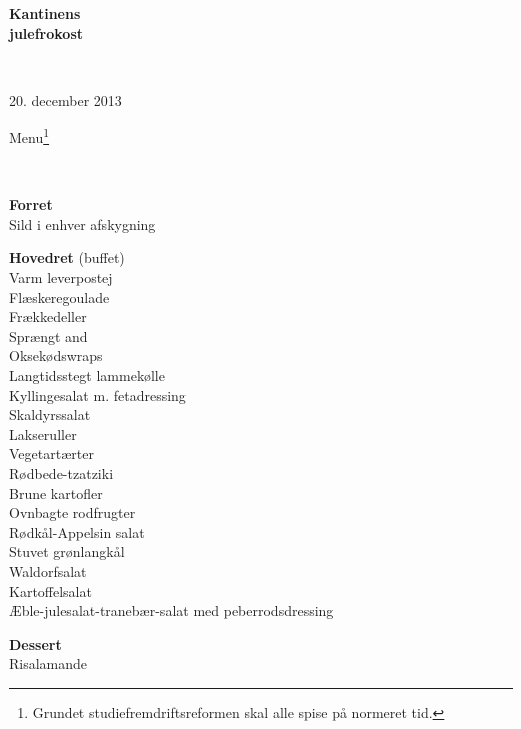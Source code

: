 \begin{center}
\begin{HUGE}
\textbf{Kantinens \\[3mm] julefrokost}
\end{HUGE}
\\[.6cm]
\begin{Large}
20. december 2013
\end{Large}
\end{center}
\vspace*{.01cm}
\begin{flushleft}
\begin{huge}
    Menu\footnote{Grundet studiefremdriftsreformen skal alle spise på normeret
    tid.}
\end{huge}
\\[.1cm]
\newcommand{\course}[1]{\vspace*{4mm} \textbf{#1} \vspace{1mm}}
{\small
\course{Forret}
\\ Sild i enhver afskygning

\vspace{-.2cm}
\course{Hovedret} (buffet)
\\ Varm leverpostej
\\ Flæskeregoulade
\\ Frækkedeller
\\ Sprængt and
\\ Oksekødswraps
\\ Langtidsstegt lammekølle
\\ Kyllingesalat m. fetadressing
\\[2mm] Skaldyrssalat
\\ Lakseruller
\\[2mm] Vegetartærter
\\ Rødbede-tzatziki
\\ Brune kartofler
\\ Ovnbagte rodfrugter
\\ Rødkål-Appelsin salat
\\ Stuvet grønlangkål
\\ Waldorfsalat
\\ Kartoffelsalat
\\ Æble-julesalat-tranebær-salat med peberrodsdressing

\vspace{-.2cm}
\course{Dessert}
\\ Risalamande
}
\end{flushleft}


